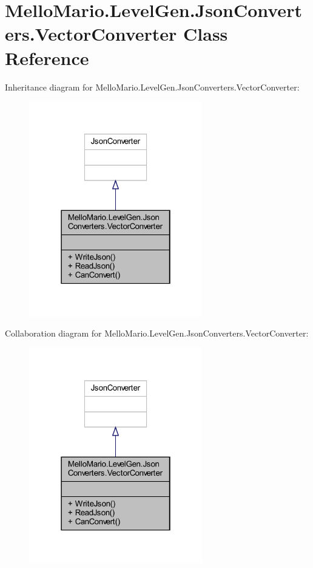 \section{Mello\+Mario.\+Level\+Gen.\+Json\+Converters.\+Vector\+Converter Class Reference}
\label{classMelloMario_1_1LevelGen_1_1JsonConverters_1_1VectorConverter}


Inheritance diagram for Mello\+Mario.\+Level\+Gen.\+Json\+Converters.\+Vector\+Converter\+:
\nopagebreak
\begin{figure}[H]
\begin{center}
\leavevmode
\includegraphics[width=214pt]{classMelloMario_1_1LevelGen_1_1JsonConverters_1_1VectorConverter__inherit__graph}
\end{center}
\end{figure}


Collaboration diagram for Mello\+Mario.\+Level\+Gen.\+Json\+Converters.\+Vector\+Converter\+:
\nopagebreak
\begin{figure}[H]
\begin{center}
\leavevmode
\includegraphics[width=214pt]{classMelloMario_1_1LevelGen_1_1JsonConverters_1_1VectorConverter__coll__graph}
\end{center}
\end{figure}
